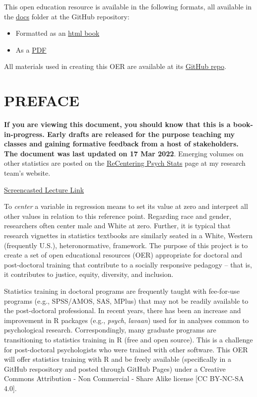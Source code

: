\documentclass[
  11pt,
]{book}
\providecommand{\tightlist}{%
  \setlength{\itemsep}{0pt}\setlength{\parskip}{0pt}}
\begin{document}
This open education resource is available in the following formats, all available in the \href{https://github.com/lhbikos/ReC_MultivModel/tree/main/docs}{docs} folder at the GitHub repository:

\begin{itemize}
\tightlist
\item
  Formatted as an \href{https://lhbikos.github.io/MultilevelModeling/}{html book}
\item
  As a \href{https://github.com/lhbikos/MultilevelModeling/blob/main/ReC_Multilevel.pdf}{PDF}
\end{itemize}

All materials used in creating this OER are available at its \href{https://github.com/lhbikos/MultilevelModeling}{GitHub repo}.

\hypertarget{preface}{%
\chapter*{PREFACE}\label{preface}}

\textbf{If you are viewing this document, you should know that this is a book-in-progress. Early drafts are released for the purpose teaching my classes and gaining formative feedback from a host of stakeholders. The document was last updated on 17 Mar 2022}. Emerging volumes on other statistics are posted on the \href{https://lhbikos.github.io/BikosRVT/ReCenter.html}{ReCentering Psych Stats} page at my research team's website.

\href{https://spu.hosted.panopto.com/Panopto/Pages/Viewer.aspx?id=c932455e-ef06-444a-bdca-acf7012d759a}{Screencasted Lecture Link}

To \emph{center} a variable in regression means to set its value at zero and interpret all other values in relation to this reference point. Regarding race and gender, researchers often center male and White at zero. Further, it is typical that research vignettes in statistics textbooks are similarly seated in a White, Western (frequently U.S.), heteronormative, framework. The purpose of this project is to create a set of open educational resources (OER) appropriate for doctoral and post-doctoral training that contribute to a socially responsive pedagogy -- that is, it contributes to justice, equity, diversity, and inclusion.

Statistics training in doctoral programs are frequently taught with fee-for-use programs (e.g., SPSS/AMOS, SAS, MPlus) that may not be readily available to the post-doctoral professional. In recent years, there has been an increase and improvement in R packages (e.g., \emph{psych}, \emph{lavaan}) used for in analyses common to psychological research. Correspondingly, many graduate programs are transitioning to statistics training in R (free and open source). This is a challenge for post-doctoral psychologists who were trained with other software. This OER will offer statistics training with R and be freely available (specifically in a GitHub respository and posted through GitHub Pages) under a Creative Commons Attribution - Non Commercial - Share Alike license {[}CC BY-NC-SA 4.0{]}.
\end{document}
